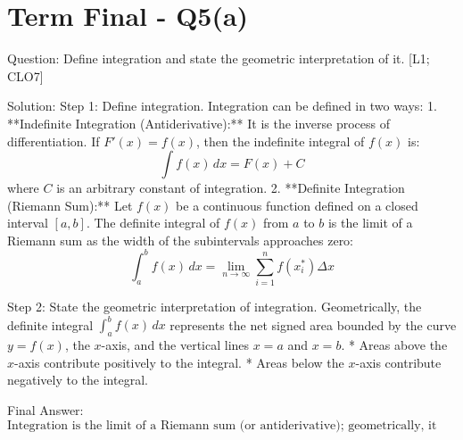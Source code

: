 \documentclass[11pt, a4paper]{article}
\begin{document}


\section*{Term Final - Q5(a)}

Question:
Define integration and state the geometric interpretation of it. [L1; CLO7]

Solution:
Step 1: Define integration.
Integration can be defined in two ways:
1. **Indefinite Integration (Antiderivative):** It is the inverse process of differentiation. If $F'(x) = f(x)$, then the indefinite integral of $f(x)$ is:
\[
\int f(x) \, dx = F(x) + C
\]
where $C$ is an arbitrary constant of integration.
2. **Definite Integration (Riemann Sum):** Let $f(x)$ be a continuous function defined on a closed interval $[a, b]$. The definite integral of $f(x)$ from $a$ to $b$ is the limit of a Riemann sum as the width of the subintervals approaches zero:
\[
\int_{a}^{b} f(x) \, dx = \lim_{n \to \infty} \sum_{i=1}^{n} f(x_i^*) \Delta x
\]

Step 2: State the geometric interpretation of integration.
Geometrically, the definite integral $\int_{a}^{b} f(x) \, dx$ represents the net signed area bounded by the curve $y = f(x)$, the $x$-axis, and the vertical lines $x = a$ and $x = b$. 
* Areas above the $x$-axis contribute positively to the integral.
* Areas below the $x$-axis contribute negatively to the integral.

Final Answer:
\[
\boxed{\text{Integration is the limit of a Riemann sum (or antiderivative); geometrically, it represents the net signed area under a curve.}}
\]



\end{document}
